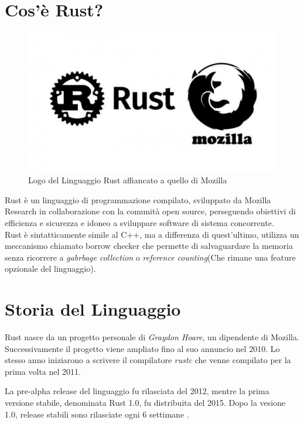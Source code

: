 \section{Cos'è Rust?}
\label{section:rust_intro}

\begin{figure}[ht]
    \centering
    \includegraphics[scale= 0.5]{images/rustlang.jpg}
    \caption{Logo del Linguaggio Rust affiancato a quello di Mozilla}
    \label{fig:rustlang}
\end{figure}

Rust è un linguaggio di programmazione compilato, sviluppato da Mozilla Research in collaborazione con la comunità open source, perseguendo obiettivi di efficienza e sicurezza e idoneo a sviluppare software di sistema concorrente. \\
Rust è sintatticamente simile al C++, ma a differenza di quest'ultimo, utilizza un meccanismo chiamato borrow checker che permette di salvaguardare la memoria senza ricorrere a \textit{gabrbage collection} o \textit{reference counting}(Che rimane una feature opzionale del linguaggio)\cite{10.5555/3271463}.

\section{Storia del Linguaggio}
Rust nasce da un progetto personale di \textit{Graydon Hoare}, un dipendente di Mozilla. Successivamente il progetto viene ampliato fino al suo annuncio nel 2010.
Lo stesso anno iniziarono a scrivere il compilatore \textit{rustc} che venne compilato per la prima volta nel 2011.

La pre-alpha release del linguaggio fu rilasciata del 2012, mentre la prima versione stabile, denominata Rust 1.0, fu distribuita del 2015. Dopo la vesione 1.0, release stabili sono rilasciate ogni 6 settimane \cite{rusthistory}.

